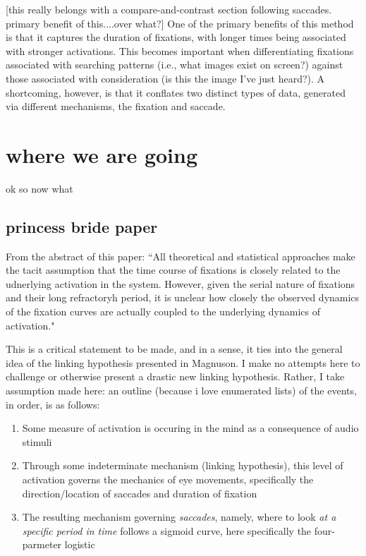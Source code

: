 \documentclass{article}
\begin{document}
[this really belongs with a compare-and-contrast section following saccades. primary benefit of this....over what?] One of the primary benefits of this method is that it captures the duration of fixations, with longer times being associated with stronger activations. This becomes important when differentiating fixations associated with searching patterns (i.e., what images exist on screen?) against those associated with consideration (is this the image I've just heard?). A shortcoming, however, is that it conflates two distinct types of data, generated via different mechanisms, the fixation and saccade. 

\section{where we are going} 

ok so now what

\subsection{princess bride paper}

From the abstract of this paper: ``All theoretical and statistical approaches make the tacit assumption that the time course of fixations is closely related to the udnerlying activation in the system. However, given the serial nature of fixations and their long refractoryh period, it is unclear how closely the observed dynamics of the fixation curves are actually coupled to the underlying dynamics of activation."

This is a critical statement to be made, and in a sense, it ties into the general idea of the linking hypothesis presented in Magnuson. I make no attempts here to challenge or otherwise present a drastic new linking hypothesis. Rather, I take assumption made here: an outline (because i love enumerated lists) of the events, in order, is as follows:

\begin{singlespace}
\begin{enumerate}
\item Some measure of activation is occuring in the mind as a consequence of audio stimuli
\item Through some indeterminate mechanism (linking hypothesis), this level of activation governs the mechanics of eye movements, specifically the direction/location of saccades and duration of fixation
\item The resulting mechanism governing \textit{saccades}, namely, where to look \textit{at a specific period in time} follows a sigmoid curve, here specifically the four-parmeter logistic
\end{enumerate}
\end{singlespace}
\end{document}
